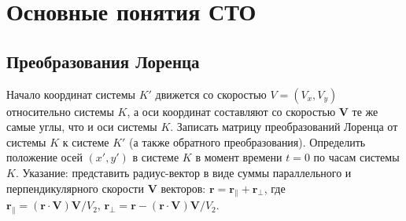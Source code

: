 \section{Основные понятия СТО}
\subsection{Преобразования Лоренца}
\begin{problem}
	Начало координат системы $K′$ движется со скоростью $V = (V_x, V_y)$ относительно системы $K$, а оси координат составляют со скоростью $\mathbf{V}$ те же самые углы, что и оси системы $K$. 
	Записать матрицу преобразований Лоренца от системы $K$ к системе $K′$ (а также обратного преобразования).
	Определить положение осей $(x′, y′)$ в системе $K$ в момент времени $t = 0$ по часам системы $K$.
	Указание: представить радиус-вектор в виде суммы параллельного и перпендикулярного скорости $\mathbf{V}$ векторов: $\mathbf{r} = \mathbf{r_\parallel} + \mathbf{r_\perp}$, где $\mathbf{r_\parallel} = (\mathbf{r} \cdot \mathbf{V})\mathbf{V}/V_2,\, \mathbf{r_\perp} = \mathbf{r} − (\mathbf{r} \cdot \mathbf{V}) \mathbf{V}/V_2$.
\end{problem}
